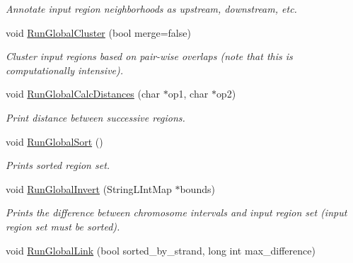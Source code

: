 \begin{CompactItemize}
\begin{CompactList}\small\item\em Annotate input region neighborhoods as upstream, downstream, etc. \item\end{CompactList}\item 
\hypertarget{classGenomicRegionSet_619b51265f7bf5d6c92144de689ca8a2}{
void \hyperlink{classGenomicRegionSet_619b51265f7bf5d6c92144de689ca8a2}{RunGlobalCluster} (bool merge=false)}
\label{classGenomicRegionSet_619b51265f7bf5d6c92144de689ca8a2}

\begin{CompactList}\small\item\em Cluster input regions based on pair-wise overlaps (note that this is computationally intensive). \item\end{CompactList}\item 
\hypertarget{classGenomicRegionSet_3d550572975732566378797ac1d8119b}{
void \hyperlink{classGenomicRegionSet_3d550572975732566378797ac1d8119b}{RunGlobalCalcDistances} (char $\ast$op1, char $\ast$op2)}
\label{classGenomicRegionSet_3d550572975732566378797ac1d8119b}

\begin{CompactList}\small\item\em Print distance between successive regions. \item\end{CompactList}\item 
\hypertarget{classGenomicRegionSet_2d6dc99608a1d4938b421fa5a85f5477}{
void \hyperlink{classGenomicRegionSet_2d6dc99608a1d4938b421fa5a85f5477}{RunGlobalSort} ()}
\label{classGenomicRegionSet_2d6dc99608a1d4938b421fa5a85f5477}

\begin{CompactList}\small\item\em Prints sorted region set. \item\end{CompactList}\item 
\hypertarget{classGenomicRegionSet_1056659ccda2e39febb6b87d858a88c4}{
void \hyperlink{classGenomicRegionSet_1056659ccda2e39febb6b87d858a88c4}{RunGlobalInvert} (StringLIntMap $\ast$bounds)}
\label{classGenomicRegionSet_1056659ccda2e39febb6b87d858a88c4}

\begin{CompactList}\small\item\em Prints the difference between chromosome intervals and input region set (input region set must be sorted). \item\end{CompactList}\item 
\hypertarget{classGenomicRegionSet_b9783fb4fead289c7fe107f9bec1865b}{
void \hyperlink{classGenomicRegionSet_b9783fb4fead289c7fe107f9bec1865b}{RunGlobalLink} (bool sorted\_\-by\_\-strand, long int max\_\-difference)}
\label{classGenomicRegionSet_b9783fb4fead289c7fe107f9bec1865b}


\end{CompactItemize}

